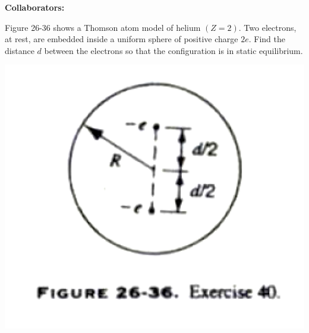 \documentclass[11pt,letterpaper,boxed]{hmcpset}
\begin{document}
	
	\noindent\textbf{Collaborators:} 
	
	
	\begin{problem}[HRK E36.40]
		Figure 26-36 shows a Thomson atom model of helium $(Z = 2)$. Two electrons, at rest, are embedded inside a uniform sphere of positive charge $2e$. Find the distance $d$ between the electrons so that the configuration is in static equilibrium.
		
		\begin{center}
			\includegraphics[scale=0.55]{26-36.png}
		\end{center}
		
	\end{problem}
	
	\begin{solution}
		\vfill
	\end{solution}
	\newpage
	
	
	
\end{document}
